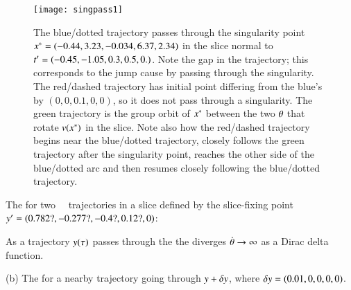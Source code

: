  \begin{figure}
\texttt{[image: singpass1]}
 \caption{\label{fig:singpass}
The blue/dotted trajectory passes through the singularity point
$x^*=(-0.44, 3.23, -0.034, 6.37, 2.34)$ in the slice normal to
$t'_{}=(-0.45, -1.05, 0.3, 0.5, 0.)$.
Note the gap in the trajectory; this corresponds to the jump cause by
passing through the singularity. The red/dashed trajectory has initial
point differing from the blue's by $(0,0,0.1,0,0)$, so it does not pass
through a singularity. The green trajectory is the group orbit of
$x^*$ between the two ${\bf \theta}$ that rotate $v(x^*)$ in the
slice. Note also how the red/dashed trajectory begins near the
blue/dotted trajectory, closely follows the green trajectory after the
singularity point, reaches the other side of the blue/dotted arc and then
resumes closely following the blue/dotted trajectory.
 }%
 \end{figure}



The {\groupVel} for two \cLf\
\reducedsp\ trajectories in a slice defined by the slice-fixing
point ${y'}=(0.782?,-0.277?,-0.4?,0.12?,0)$:

As a trajectory $y(\tau)$ passes through the
{\sset} 
the {\groupVel} diverges
$\dot{{\bf \theta}} \to \infty$ as a Dirac delta function.

(b) The {\groupVel} for a nearby trajectory going
through $y+\delta y$,
where $\delta y=(0.01,0,0,0,0)$.




%

